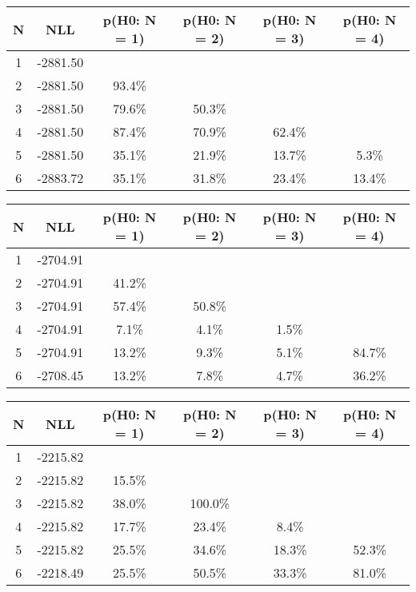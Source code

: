 \begin{table}[h!]
	\centering
	\begin{tabular}{cc||cccc}
		N & NLL & p(H0: N = 1) & p(H0: N = 2) & p(H0: N = 3) & p(H0: N = 4)\\ 
		\hline
1 & -2881.50 & & & & \\
2 & -2881.50 & 93.4\% & & & \\
3 & -2881.50 & 79.6\% & 50.3\% & & \\
4 & -2881.50 & 87.4\% & 70.9\% & 62.4\% & \\
5 & -2881.50 & 35.1\% & 21.9\% & 13.7\% & 5.3\% \\
6 & -2883.72 & 35.1\% & 31.8\% & 23.4\% & 13.4\% \\
	\end{tabular}
	\label{tab:lab}
\end{table}

\begin{table}[h!]
	\centering
	\begin{tabular}{cc||cccc}
		N & NLL & p(H0: N = 1) & p(H0: N = 2) & p(H0: N = 3) & p(H0: N = 4)\\ 
		\hline
1 & -2704.91 & & & & \\
2 & -2704.91 & 41.2\% & & & \\
3 & -2704.91 & 57.4\% & 50.8\% & & \\
4 & -2704.91 & 7.1\% & 4.1\% & 1.5\% & \\
5 & -2704.91 & 13.2\% & 9.3\% & 5.1\% & 84.7\% \\
6 & -2708.45 & 13.2\% & 7.8\% & 4.7\% & 36.2\% \\
	\end{tabular}
	\label{tab:lab}
\end{table}

\begin{table}[h!]
	\centering
	\begin{tabular}{cc||cccc}
		N & NLL & p(H0: N = 1) & p(H0: N = 2) & p(H0: N = 3) & p(H0: N = 4)\\ 
		\hline
1 & -2215.82 & & & & \\
2 & -2215.82 & 15.5\% & & & \\
3 & -2215.82 & 38.0\% & 100.0\% & & \\
4 & -2215.82 & 17.7\% & 23.4\% & 8.4\% & \\
5 & -2215.82 & 25.5\% & 34.6\% & 18.3\% & 52.3\% \\
6 & -2218.49 & 25.5\% & 50.5\% & 33.3\% & 81.0\% \\
	\end{tabular}
	\label{tab:lab}
\end{table}

